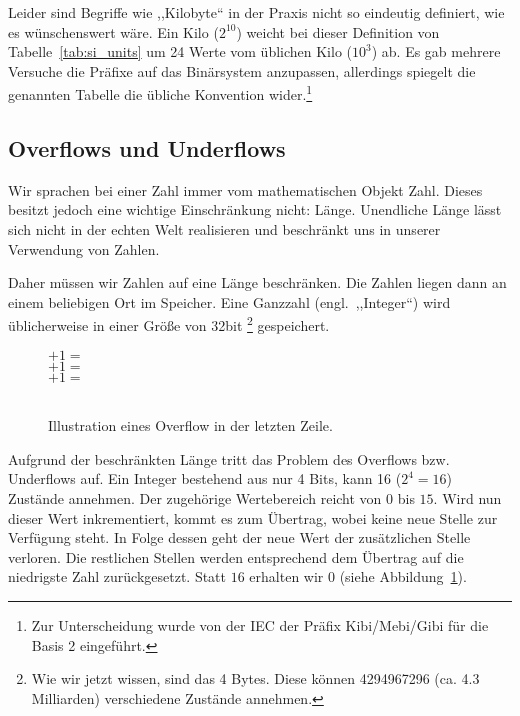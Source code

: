 Leider sind Begriffe wie ,,Kilobyte`` in der Praxis nicht so eindeutig definiert, wie es wünschenswert wäre. Ein Kilo ($2^{10}$) weicht bei dieser Definition von Tabelle~\ref{tab:si_units} um 24 Werte vom üblichen Kilo ($10^3$) ab. Es gab mehrere Versuche die Präfixe auf das Binärsystem anzupassen, allerdings spiegelt die genannten Tabelle die übliche Konvention wider.\footnote{Zur Unterscheidung wurde von der IEC der Präfix Kibi/Mebi/Gibi für die Basis 2 eingeführt.}

\subsection{Overflows und Underflows}
%
Wir sprachen bei einer Zahl immer vom mathematischen Objekt Zahl. Dieses
besitzt jedoch eine wichtige Einschränkung nicht: Länge. Unendliche Länge
lässt sich nicht in der echten Welt realisieren und beschränkt uns in
unserer Verwendung von Zahlen.

Daher müssen wir Zahlen auf eine Länge beschränken. Die Zahlen liegen
dann an einem beliebigen Ort im Speicher. Eine Ganzzahl (engl.~,,Integer``)
wird üblicherweise in einer Größe von 32bit%
\footnote{Wie wir jetzt wissen, sind das 4 Bytes. Diese können 4294967296
(ca. 4.3 Milliarden) verschiedene Zustände annehmen.}
gespeichert.

\begin{figure}[ht]
  \begin{center}
        $+ 1 =$ \\
        $+ 1 =$ \\
        $+ 1 =$ \\
        \hspace{27.5pt}~
  \end{center}
  \caption{Illustration eines Overflow in der letzten Zeile.}
  \label{fig:overflow}
\end{figure}
%
Aufgrund der beschränkten Länge tritt das Problem des Overflows bzw.
Underflows auf. Ein Integer bestehend aus nur 4 Bits, kann 16 ($2^4 = 16$)
Zustände annehmen. Der zugehörige Wertebereich reicht von $0$ bis $15$.
Wird nun dieser Wert inkrementiert, kommt es zum Übertrag, wobei keine
neue Stelle zur Verfügung steht. In Folge dessen geht der neue Wert der
zusätzlichen Stelle verloren. Die restlichen Stellen werden entsprechend
dem Übertrag auf die niedrigste Zahl zurückgesetzt. Statt $16$ erhalten wir
$0$ (siehe Abbildung~\ref{fig:overflow}).

